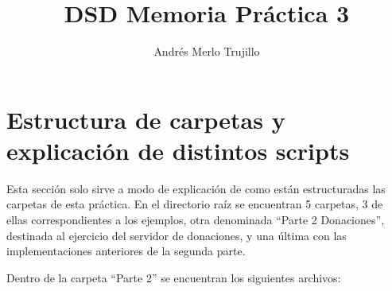 \documentclass{article}
\title{DSD Memoria Práctica 3}
\author{Andrés Merlo Trujillo}
\date{}
\begin{document}
\maketitle

\section{Estructura de carpetas y explicación de distintos scripts}
Esta sección solo sirve a modo de explicación de como están estructuradas las carpetas de esta práctica. En el directorio raíz se encuentran 5 carpetas, 3 de ellas correspondientes a los ejemplos, otra denominada ``Parte 2 Donaciones'', destinada al ejercicio del servidor de donaciones, y una última con las implementaciones anteriores de la segunda parte.

Dentro de la carpeta ``Parte 2'' se encuentran los siguientes archivos:
\end{document}
